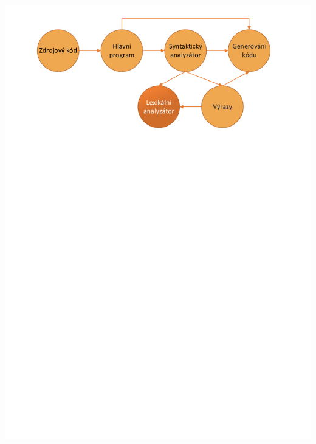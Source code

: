 \documentclass[11pt, hyperref={unicode}]{beamer}
\begin{document}
\begin{frame}
\begin{overprint}
 	\centerline{\includegraphics[width=0.95\linewidth]{img/scanner.pdf}}%

\end{overprint}
\end{frame}
\end{document}
